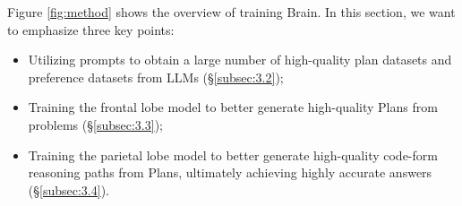 \documentclass[11pt]{article}
\begin{document}
Figure \ref{fig:method} shows the overview of training Brain. In this section, we want to emphasize three key points: 
\begin{itemize}
    \item[1.] Utilizing prompts to obtain a large number of high-quality plan datasets and preference datasets from LLMs (\S \ref{subsec:3.2});
    \item[2.] Training the frontal lobe model to better generate high-quality Plans from problems (\S \ref{subsec:3.3});
    \item[3.] Training the parietal lobe model to better generate high-quality code-form reasoning paths from Plans, ultimately achieving highly accurate answers (\S \ref{subsec:3.4}).
\end{itemize}
\end{document}
